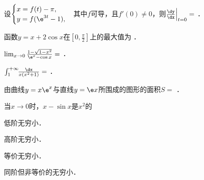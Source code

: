 \documentclass[plain,noanswer,medmath]{../../template/jnuexam}
\begin{document}






\begin{problem}
设$\begin{cases}
 x = f(t) - \pi , \\
 y = f(\e^{3t} - 1),
\end{cases}$其中$f$可导，且$f'(0) \ne 0$，则$\frac{\dy}{\dx}\Big|_{t=0}=$ \fillin{}．
\end{problem}


\begin{problem}
函数$y = x + 2\cos x$在$\left[0,\frac{\pi}{2} \right]$上的最大值为 \fillin{}．
\end{problem}


\begin{problem}
$\lim_{x \to 0} \frac{1 - \sqrt{1 - x^2}}{\e^x - \cos x} =$ \fillin{}．
\end{problem}


\begin{problem}
$\int_1^{+\infty}\!\!\frac{\dx}{x(x^2 + 1)} =$ \fillin{}．
\end{problem}


\begin{problem}
由曲线$y = x\e^x$与直线$y = \e x$所围成的图形的面积$S=$ \fillin{}．
\end{problem}




\begin{problem}
当$x \to 0$时，$x - \sin x$是$x^2$的\pickout{}
\begin{abcd}
\item 低阶无穷小．				
\item 高阶无穷小．
\item 等价无穷小．				
\item 同阶但非等价的无穷小．
\end{abcd}
\end{problem}
\end{document}
